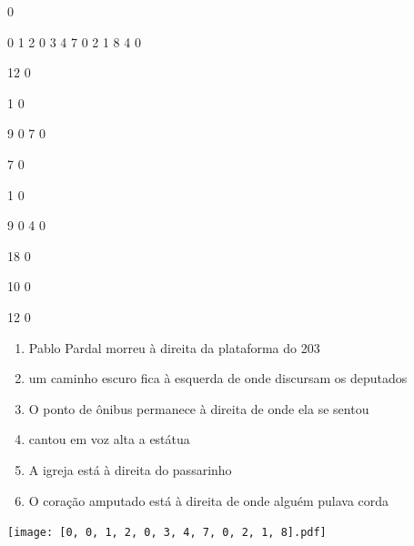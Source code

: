 \documentclass[12pt]{article}
\begin{document}
		\vfill  
		  
{
	0	%

	0	%
	1	%
	2	%
	0	%
	3	%
	4	%
	7	%
	0	%
	2	%
	1	%
	8	%
	4	%
	0	%

	12	%
	0	%

	1	%
	0	%

	9	%
	0	%
	7	%
	0	%

	7	%
	0	%

	1	%
	0	%

	9	%
	0	%
	4	%
	0	%

	18	%
	0	%

	10	%
	0	%

	12	%
	0	%

}	  
		    	

		 

\pagebreak


	\begin{enumerate}
		  \sffamily %
		  \large %


\vfill \item
Pablo Pardal morreu	%
à direita
da plataforma do 203	%

\vfill \item
um caminho escuro fica	%
à esquerda
de onde discursam os deputados	%

\vfill \item
O ponto de ônibus permanece	%
à direita
de onde ela se sentou	%

\vfill \item
cantou em voz alta	%
a estátua	%

\vfill \item
A igreja está	%
à direita
do passarinho	%

\vfill \item
O coração amputado está	%
à direita
de onde alguém pulava corda	%
	\end{enumerate}
		  
		  \hfill

		  \vfill

\texttt{[image: [0, 0, 1, 2, 0, 3, 4, 7, 0, 2, 1, 8].pdf]}


	\hfill	  	  
\end{document}

